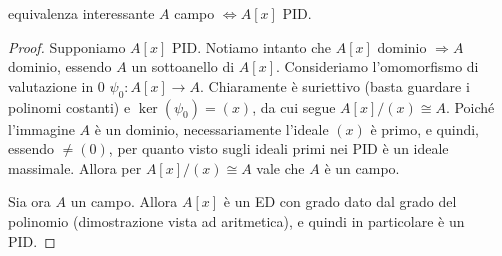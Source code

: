 \begin{theorem}{equivalenza interessante}
    $A$ campo $\iff A[x]$ PID.
\end{theorem}
\begin{proof}
    Supponiamo $A[x]$ PID. Notiamo intanto che $A[x]$ dominio $\Rightarrow A$ dominio, essendo $A$ un sottoanello di $A[x]$. Consideriamo l'omomorfismo di valutazione in $0$ $\psi_0: A[x] \rightarrow A$. Chiaramente è suriettivo (basta guardare i polinomi costanti) e $\ker(\psi_0) = (x)$, da cui segue $A[x]/(x) \cong A$. Poiché l'immagine $A$ è un dominio, necessariamente l'ideale $(x)$ è primo, e quindi, essendo $\neq (0)$, per quanto visto sugli ideali primi nei PID è un ideale massimale. Allora per $A[x]/(x) \cong A$ vale che $A$ è un campo.
    
    Sia ora $A$ un campo. Allora $A[x]$ è un ED con grado dato dal grado del polinomio (dimostrazione vista ad aritmetica), e quindi in particolare è un PID. 
\end{proof}

